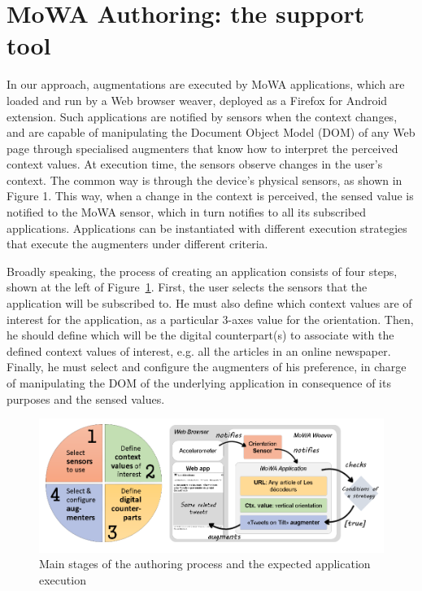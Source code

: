 \documentclass[runningheads]{llncs}
\begin{document}
\section{MoWA Authoring: the support tool}
In our approach, augmentations are executed by MoWA applications, which are loaded and run by a Web browser weaver, deployed as a Firefox for Android extension. Such applications are notified by sensors when the context changes, and are capable of manipulating the Document Object Model (DOM) of any Web page through specialised augmenters that know how to interpret the perceived context values. At execution time, the sensors observe changes in the user’s context. The common way is through the device’s physical sensors, as shown in Figure 1. This way, when a change in the context is perceived, the sensed value is notified to the MoWA sensor, which in turn notifies to all its subscribed applications. Applications can be instantiated with different execution strategies that execute the augmenters under different criteria.

Broadly speaking, the process of creating an application consists of four steps, shown at the left of Figure~\ref{fig1}. First, the user selects the sensors that the application will be subscribed to. He must also define which context values are of interest for the application, as a particular 3-axes value for the orientation. Then, he should define which will be the digital counterpart(s) to associate with the defined context values of interest, e.g. all the articles in an online newspaper. Finally, he must select and configure the augmenters of his preference, in charge of manipulating the DOM of the underlying application in consequence of its purposes and the sensed values. 

\begin{figure}
\includegraphics[width=\textwidth]{fig1.png}
\caption{Main stages of the authoring process and the expected application execution} \label{fig1}
\end{figure}
\end{document}
